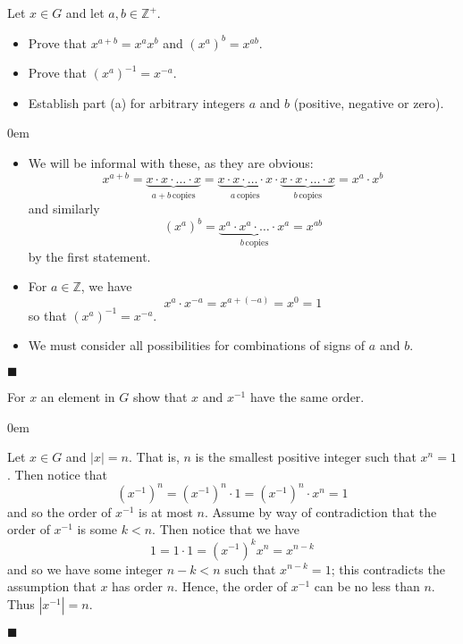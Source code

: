 \documentclass[12pt]{article}
\renewcommand{\qed}{\hfill$\blacksquare$}
\renewenvironment{proof}{\begin{addmargin}[1em]{0em}\begin{newproof}}{\end{newproof}\end{addmargin}\qed}
\newenvironment{problem}[2][Exercise]{\begin{trivlist}
\item[\hskip \labelsep {\bfseries #1}\hskip \labelsep {\bfseries #2.}]}{\end{trivlist}}
\begin{document}
\begin{problem}{1.1.19}
Let $x\in G$ and let $a,b\in \mathbb{Z}^+$.
\begin{itemize}
    \item Prove that $x^{a+b}=x^ax^b$ and $\left(x^a\right)^b = x^{ab}$.
    \item Prove that $\left(x^a\right)^{-1}=x^{-a}$.
    \item Establish part (a) for arbitrary integers $a$ and $b$ (positive, negative or zero).
\end{itemize}
\end{problem}
\begin{proof}
\begin{itemize}
    \item We will be informal with these, as they are obvious:
    $$ x^{a+b} = \underbrace{x\cdot x \cdot \ldots \cdot x}_{a+b \, \text{copies}} = \underbrace{x\cdot x\cdot \ldots \cdot x}_{a\, \text{copies}} \cdot \underbrace{x\cdot x\cdot \ldots \cdot x}_{b \, \text{copies}} = x^a \cdot x^b$$
    and similarly
    $$ \left(x^a\right)^b = \underbrace{x^a \cdot x^a \cdot \ldots \cdot x^a}_{b \, \text{copies}} = x^{ab}$$
    by the first statement.

    \item For $a\in \mathbb{Z}$, we have
    $$ x^a\cdot x^{-a} = x^{a+\left(-a\right)} = x^0 = 1 $$ so that $\left(x^a\right)^{-1} = x^{-a}$.

    \item We must consider all possibilities for combinations of signs of $a$ and $b$.

\end{itemize}
\end{proof}








\begin{problem}{1.1.20}
For $x$ an element in $G$ show that $x$ and $x^{-1}$ have the same order.
\end{problem}
\begin{proof}
Let $x\in G$ and $\left|x\right|=n$. That is, $n$ is the smallest positive integer such that $x^n=1$. Then notice that
$$ \left(x^{-1}\right)^n = \left(x^{-1}\right)^n \cdot 1 = \left(x^{-1}\right)^n \cdot x^n = 1 $$
and so the order of $x^{-1}$ is at most $n$. Assume by way of contradiction that the order of $x^{-1}$ is some $k < n$. Then notice that we have
$$ 1 = 1\cdot 1 = \left(x^{-1}\right)^{k} x^n = x^{n-k} $$
and so we have some integer $n-k < n$ such that $x^{n-k} = 1$; this contradicts the assumption that $x$ has order $n$. Hence, the order of $x^{-1}$ can be no less than $n$. Thus $\left|x^{-1}\right|=n$.
\end{proof}
\end{document}
